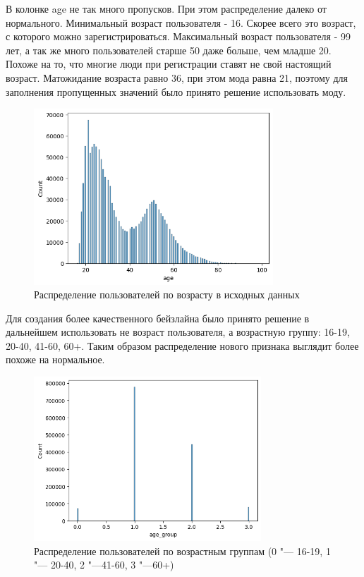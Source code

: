 \documentclass[bachelor, och, coursework]{SCWorks}
\begin{document}
В колонке age не так много пропусков. При этом распределение далеко от нормального. Минимальный возраст пользователя - 16. Скорее всего это возраст, с которого можно зарегистрироваться. Максимальный возраст пользователя - 99 лет, а так же много пользователей старше 50 даже больше, чем младше 20. Похоже на то, что многие люди при регистрации ставят не свой настоящий возраст. Матожидание возраста равно 36, при этом мода равна 21, поэтому для заполнения пропущенных значений было принято решение использовать моду.
\begin{figure}[H]
    \centering
    \includegraphics[width=0.8\textwidth]{pic/6}
    \caption{Распределение пользователей по возрасту в исходных данных}
    \label{fig:img1}
\end{figure}

Для создания более качественного бейзлайна было принято решение в дальнейшем использовать не возраст пользователя, а возрастную группу: 16-19, 20-40, 41-60, 60+. Таким образом распределение нового признака
выглядит более похоже на нормальное.

\begin{figure}[H]
    \centering
    \includegraphics[width=0.76\textwidth]{pic/7}
    \caption{Распределение пользователей по возрастным группам (0 "--- 16-19, 1 "--- 20-40, 2 "---41-60, 3 "---60+)}
    \label{fig:img1}
\end{figure}
\end{document}
